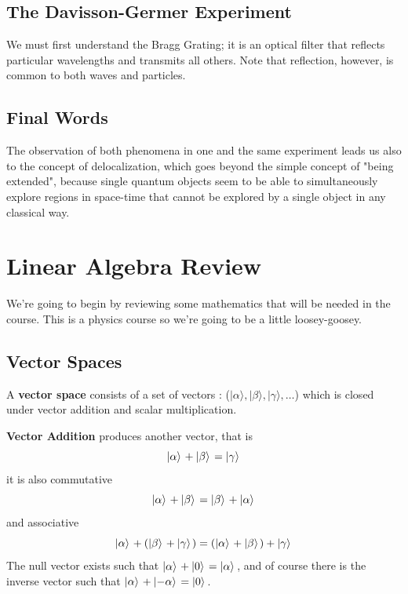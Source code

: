 \documentclass[english, 11pt]{article}
\begin{document}
     \subsection{The Davisson-Germer Experiment}
       We must first understand the Bragg Grating; it is an optical filter that reflects particular wavelengths and transmits all others. Note that reflection, however, is common to both waves and particles.

     \subsection{Final Words}
       The observation of both phenomena in one and the same experiment leads us also to the concept of delocalization, which goes beyond the simple concept of "being extended", because single quantum objects seem to be able to simultaneously explore regions in space-time that cannot be explored by a single object in any classical way.

   \section{Linear Algebra Review}

     We're going to begin by reviewing some mathematics that will be needed in the course. This is a physics course so we're going to be a little loosey-goosey.

     \subsection{Vector Spaces}
        \begin{defn}\label{vector_space}
          A {\bf vector space} consists of a set of vectors : ($|\alpha\rangle, |\beta\rangle, |\gamma\rangle, \ldots$) which is closed under vector addition and scalar multiplication.
        \end{defn}
        {\bf Vector Addition} produces another vector, that is
        \[ \left| \alpha \rangle \right. + \left| \beta \rangle \right. = \left| \gamma \rangle \right.  \]
        it is also commutative
        \[ \left| \alpha \rangle \right. + \left| \beta \rangle \right. =  \left| \beta \rangle \right.  + \left| \alpha \rangle \right. \]
        and associative
        \[ \left| \alpha \rangle \right. + (\left| \beta \rangle \right. + \left| \gamma \rangle \right.) =  (\left| \alpha \rangle \right.+\left| \beta \rangle \right. ) + \left| \gamma \rangle \right. \]
        The null vector exists such that $\left| \alpha \rangle \right. + \left| 0 \rangle \right. = \left| \alpha \rangle \right.$, and of course there is the inverse vector such that $\left| \alpha \rangle \right. + \left| -\alpha \rangle \right. = \left| 0 \rangle \right.$.
        \newline
\end{document}
